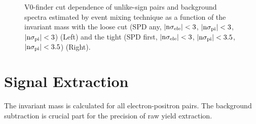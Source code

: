 {\begin{figure}[htbp]
\begin{minipage}{0.5\hsize}
\begin{center}
  \end{center}
 \end{minipage}
  \caption{V0-finder cut dependence of unlike-sign pairs and background spectra estimated by event mixing technique as a function of the invariant mass with the loose cut (SPD any, $|\rm{n}\sigma_{ele}|<3$, $|\rm{n}\sigma_{pi}|<3$, $|\rm{n}\sigma_{pi}|<3$) (Left) and the tight (SPD first, $|\rm{n}\sigma_{ele}|<3$, $|\rm{n}\sigma_{pi}|<3.5$, $|\rm{n}\sigma_{pi}|<3.5$) (Right).  }
  \label{fig_4_v0tag}
\end{figure}

\section{Signal Extraction}
\label{sec_4_signalextraction}
The invariant mass is calculated for all electron-positron pairs. 
The background subtraction is crucial part for the precision of raw yield extraction.  

}
